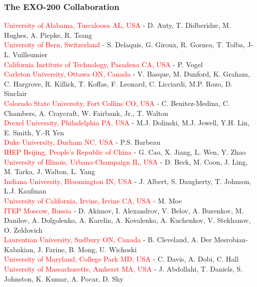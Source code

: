 \documentclass{beamer}
\begin{document}
\begin{frame}
\begin{center}
\frametitle{The EXO-200 Collaboration}
\end{center}
\vspace{0.5cm}

{\tiny
\textcolor{red}{University of Alabama, Tuscaloosa AL, USA}  -  D. Auty, T. Didberidze, M. Hughes, A. Piepke, R. Tsang\\
\textcolor{red}{University of Bern, Switzerland}  -  S. Delaquis, G. Giroux, R. Gornea, T. Tolba, J-L. Vuilleumier \\
\textcolor{red}{California Institute of Technology, Pasadena CA, USA}  -  P. Vogel \\
\textcolor{red}{Carleton University, Ottawa ON, Canada}  -  V. Basque, M. Dunford, K. Graham,  C. Hargrove, R. Killick, T. Koffas, F. Leonard, C. Licciardi, M.P. Rozo, D. Sinclair\\
\textcolor{red}{Colorado State University, Fort Collins CO, USA}  -  C. Benitez-Medina, C. Chambers, A. Craycraft, W. Fairbank, Jr., T. Walton\\
\textcolor{red}{Drexel University, Philadelphia PA, USA}  -  M.J. Dolinski, M.J. Jewell, Y.H. Lin, E. Smith, Y.-R Yen\\
\textcolor{red}{Duke University, Durham NC, USA}  -  P.S. Barbeau\\
\textcolor{red}{IHEP Beijing, People's Republic of China}  -  G. Cao, X. Jiang, L. Wen, Y. Zhao \\
\textcolor{red}{University of Illinois, Urbana-Champaign IL, USA}  -  D. Beck, M. Coon, J. Ling, M. Tarka, J. Walton, L. Yang \\
\textcolor{red}{Indiana University, Bloomington IN, USA}  -  J. Albert, S. Daugherty,  T. Johnson, L.J. Kaufman\\
\textcolor{red}{University of California, Irvine, Irvine CA, USA}  -  M. Moe\\
\textcolor{red}{ITEP Moscow, Russia}  -  D. Akimov, I. Alexandrov, V. Belov, A. Burenkov, M. Danilov, A. Dolgolenko, A. Karelin, A. Kovalenko, A. Kuchenkov, V. Stekhanov, O. Zeldovich\\
\textcolor{red}{Laurentian University, Sudbury ON, Canada}  -  B. Cleveland, A. Der Mesrobian-Kabakian, J. Farine, B. Mong, U. Wichoski\\
\textcolor{red}{University of Maryland, College Park MD, USA}  -  C. Davis, A. Dobi, C. Hall \\
\textcolor{red}{University of Massachusetts, Amherst MA, USA}  -  J. Abdollahi, T. Daniels, S. Johnston, K. Kumar, A. Pocar, D. Shy\\
}
\end{frame}
\end{document}
